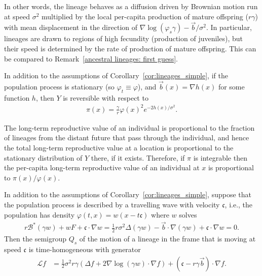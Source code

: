 \documentclass[EJP]{ejpecp} %
\newcommand{\grad}{\nabla}
\newcommand{\DG}{\mathcal{B}}  %
\newcommand{\meanq}{\vec b}    %
\newcommand{\wavespeed}{\mathfrak{c}}    %
\newcommand{\Lgen}{\mathcal{L}}    %
\newcommand{\comment}[1]{{\color{blue} \it #1}}
\begin{document}
In other words, 
the lineage behaves as a diffusion driven by Brownian motion 
run at speed $\sigma^2$ multiplied by the local per-capita production of 
mature offspring ($r \gamma$)
with mean displacement in the direction of $\grad \log(\varphi_s \gamma) - \meanq/\sigma^2$.
In particular, lineages are drawn to regions of high fecundity (production of juveniles), but their
speed is determined by the rate of production of mature offspring.
This can be compared to Remark~\ref{ancestral lineages: first guess}.

\begin{corollary} \label{cor:stationary_dist}
    In addition to the assumptions of Corollary~\ref{cor:lineages_simple},
    if the population process is stationary (so $\varphi_t \equiv \varphi$),
    and $\meanq(x) = \grad h(x)$ for some function $h$,
    then $Y$ is reversible with respect to
    \begin{align}
        \pi(x)
        =
        \frac{\gamma}{r} \varphi(x)^2 e^{-2 h(x) / \sigma^2} .
    \end{align}
\end{corollary}

The long-term reproductive value of an individual
is proportional to the fraction of lineages from the distant future that pass through the individual,
and hence the total long-term reproductive value at a location is proportional to
the stationary distribution of $Y$ there, if it exists.
Therefore,
if $\pi$ is integrable then the per-capita long-term reproductive value of an individual at $x$
is proportional to $\pi(x) / \varphi(x)$.

\begin{corollary} \label{cor:wavefront}
    In addition to the assumptions of Corollary~\ref{cor:lineages_simple},
    suppose that the population process is described by a travelling wave with 
velocity $\wavespeed$,
    i.e., the population has density
    $\varphi(t, x) = w(x - t \wavespeed)$
    where $w$ solves
    \begin{align*}
        r \DG^* (\gamma w) + w F + \wavespeed \cdot \grad w = 
        \frac{1}{2} r\sigma^2\Delta (\gamma w) -\meanq \cdot\grad (\gamma w) +\wavespeed \cdot \grad w =0 .
    \end{align*}
    Then the semigroup $Q_s$
    of the motion of a lineage in the frame that is moving at speed $\wavespeed$
    is time-homogeneous with generator
    \begin{align}
\label{Lgen}
        \Lgen f
        &=
        \frac{1}{2} \sigma^2 r \gamma
        \left(
            \Delta f
            +
            2 \grad \log (\gamma w)
            \cdot \grad f
        \right)
        + (\wavespeed - r\gamma \meanq) \cdot \grad f .
    \end{align}
\end{corollary}
\end{document}
